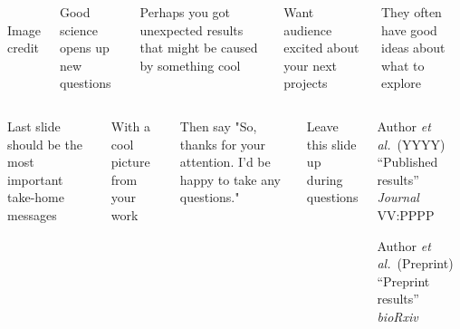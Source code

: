\documentclass[smaller,aspectratio=149]{beamer}
\begin{document}

\begin{frame}{}
\begin{columns}[T]
	\\%
	\tiny{Image credit}\par
	\bigskip\bigskip
	Good science opens up new questions \par
	\medskip Perhaps you got unexpected results that might be caused by something cool \par
	\medskip Want audience excited about your next projects \par
	\medskip They often have good ideas about what to explore \par
\end{columns}
\end{frame}

{
\begin{frame}{}
	\begin{columns}
		\bigskip\bigskip
		Last slide should be the most important take-home messages \par
		\medskip With a cool picture from your work \par
		\medskip Then say "So, thanks for your attention. I'd be happy to take any questions." \par
		\medskip Leave this slide up during questions \par
		\bigskip\bigskip
		\begin{scriptsize}
			Author \textit{et al.}~(YYYY) ``Published results'' \textit{Journal} VV:PPPP \par
			Author \textit{et al.}~(Preprint) ``Preprint results'' \textit{bioRxiv} \par
		\end{scriptsize}
		\strut
	\end{columns}
\end{frame}
}
\end{document}
